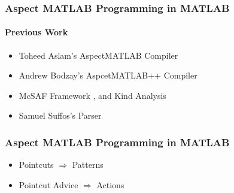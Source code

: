 \documentclass[10pt]{beamer}
\begin{document}
\begin{frame}
\frametitle{Aspect MATLAB Programming in MATLAB}
\framesubtitle{Previous Work}
\begin{itemize}
    \item Toheed Aslam's AspectMATLAB Compiler \cite{AspectMATLABpaper}
    \item Andrew Bodzay's AspcetMATLAB++ Compiler \cite{AspectMATLABPPpaper}
    \item McSAF Framework \cite{McSAF}, and Kind Analysis \cite{KindAnalysis}
    \item Samuel Suffos's Parser \cite{McLabParser}
\end{itemize}
\end{frame}

\begin{frame}
\frametitle{Aspect MATLAB Programming in MATLAB}
\begin{itemize}
    \item Pointcuts $\Rightarrow$ Patterns
    \item Pointcut Advice $\Rightarrow$ Actions
\end{itemize}
\end{frame}
\end{document}
